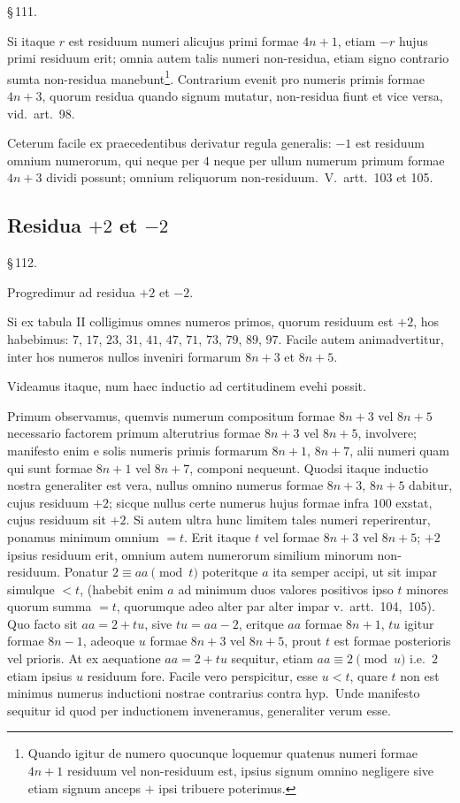 \documentclass[12pt,a4paper]{article}
\theoremstyle{plain}
\theoremstyle{definition}
\theoremstyle{remark}
\begin{document}
\begin{center}\S\,111.\end{center}

Si itaque $r$ est residuum numeri alicujus primi formae $4n+1$, etiam $-r$ hujus primi residuum erit; omnia autem talis numeri non-residua, etiam signo contrario sumta non-residua manebunt\footnote{Quando igitur de numero quocunque loquemur quatenus numeri formae $4n+1$ residuum vel non-residuum est, ipsius signum omnino negligere sive etiam signum anceps $+$ ipsi tribuere poterimus.}. Contrarium evenit pro numeris primis formae $4n+3$, quorum residua quando signum mutatur, non-residua fiunt et vice versa, vid.\ art.~98.

Ceterum facile ex praecedentibus derivatur regula generalis: $-1$ est residuum omnium numerorum, qui neque per $4$ neque per ullum numerum primum formae $4n+3$ dividi possunt; omnium reliquorum non-residuum.\ V.\ artt.~103 et 105.

\subsection*{Residua $+2$ et $-2$}

\begin{center}\S\,112.\end{center}

Progredimur ad residua $+2$ et $-2$.

Si ex tabula II colligimus omnes numeros primos, quorum residuum est $+2$, hos habebimus: $7$, $17$, $23$, $31$, $41$, $47$, $71$, $73$, $79$, $89$, $97$. Facile autem animadvertitur, inter hos numeros nullos inveniri formarum $8n+3$ et $8n+5$.

Videamus itaque, num haec inductio ad certitudinem evehi possit.

Primum observamus, quemvis numerum compositum formae $8n+3$ vel $8n+5$ necessario factorem primum alterutrius formae $8n+3$ vel $8n+5$, involvere; manifesto enim e solis numeris primis formarum $8n+1$, $8n+7$, alii numeri quam qui sunt formae $8n+1$ vel $8n+7$, componi nequeunt. Quodsi itaque inductio nostra generaliter est vera, nullus omnino numerus formae $8n+3$, $8n+5$ dabitur, cujus residuum $+2$; sicque nullus certe numerus hujus formae infra $100$ exstat, cujus residuum sit $+2$. Si autem ultra hunc limitem tales numeri reperirentur, ponamus minimum omnium $= t$. Erit itaque $t$ vel formae $8n+3$ vel $8n+5$; $+2$ ipsius residuum erit, omnium autem numerorum similium minorum non-residuum. Ponatur $2 \equiv aa \pmod{t}$ poteritque $a$ ita semper accipi, ut sit impar simulque $< t$, (habebit enim $a$ ad minimum duos valores positivos ipso $t$ minores quorum summa $= t$, quorumque adeo alter par alter impar v.\ artt.~104,~105). Quo facto sit $aa = 2 + tu$, sive $tu = aa - 2$, eritque $aa$ formae $8n+1$, $tu$ igitur formae $8n-1$, adeoque $u$ formae $8n+3$ vel $8n+5$, prout $t$ est formae posterioris vel prioris. At ex aequatione $aa = 2 + tu$ sequitur, etiam $aa \equiv 2 \pmod{u}$ i.e.\ $2$ etiam ipsius $u$ residuum fore. Facile vero perspicitur, esse $u < t$, quare $t$ non est minimus numerus inductioni nostrae contrarius contra hyp.\ Unde manifesto sequitur id quod per inductionem inveneramus, generaliter verum esse.
\end{document}
